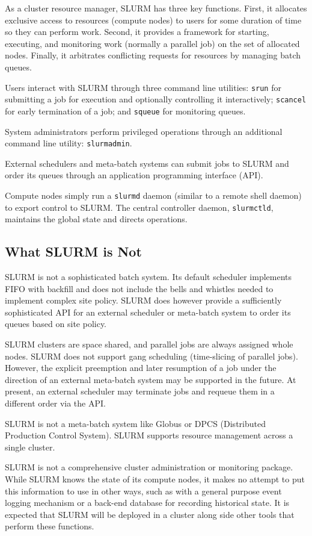 As a cluster resource manager, SLURM has three key functions.  First,
it allocates exclusive access to resources (compute nodes) to users for 
some duration of time so they can perform work.  Second, it provides 
a framework for starting, executing, and monitoring work (normally a 
parallel job) on the set of allocated nodes.  Finally, it arbitrates 
conflicting requests for resources by managing batch queues.

Users interact with SLURM through three command line utilities: 
{\tt srun} for submitting a job for execution and optionally controlling it
interactively; 
{\tt scancel} for early termination of a job; 
and {\tt squeue} for monitoring queues.

System administrators perform privileged operations through an additional
command line utility: {\tt slurmadmin}.

External schedulers and meta-batch systems can submit jobs to SLURM and
order its queues through an application programming interface (API).

Compute nodes simply run a {\tt slurmd} daemon (similar to a remote shell 
daemon) to export control to SLURM.  The central controller daemon,
{\tt slurmctld}, maintains the global state and directs operations.

\subsection{What SLURM is Not}

SLURM is not a sophisticated batch system.  Its default scheduler
implements FIFO with backfill and does not include the bells and 
whistles needed to implement complex site policy.
SLURM does however provide a sufficiently sophisticated API for an external 
scheduler or meta-batch system to order its queues based on site policy.

SLURM clusters are space shared, and parallel jobs are always 
assigned whole nodes.  SLURM does not support gang scheduling (time-slicing 
of parallel jobs). However, the explicit preemption and later resumption 
of a job under the direction of an external meta-batch system may be supported 
in the future. At present, an external scheduler may terminate jobs and 
requeue them in a different order via the API. 

SLURM is not a meta-batch system like Globus or DPCS (Distributed Production 
Control System).  SLURM supports resource management across a single cluster.

SLURM is not a comprehensive cluster administration or monitoring package.  
While SLURM knows the state of its compute nodes, it makes no attempt to put
this information to use in other ways, such as with a general purpose event
logging mechanism or a back-end database for recording historical state.
It is expected that SLURM will be deployed in a cluster along side other 
tools that perform these functions. 

